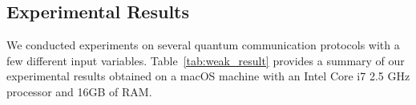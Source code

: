 \documentclass[runningheads]{llncs}
\begin{document}

\subsection{Experimental Results}\label{sec:exper}
We conducted experiments on several quantum communication protocols with a few different input variables.  
Table~\ref{tab:weak_result} provides a summary of our experimental results obtained on a macOS machine with an Intel Core i7 2.5 GHz processor and 16GB of RAM.
\end{document}
